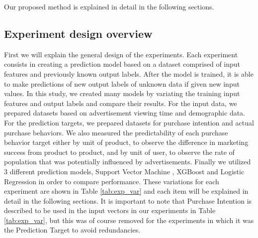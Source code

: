 \documentclass[review]{elsarticle}
\begin{document}
Our proposed method is explained in detail in the following sections.

\subsection{Experiment design overview}
\label{exp_design}

First we will explain the general design of the experiments. Each experiment consists in creating a prediction model based on a dataset comprised of input features and previously known output labels. After the model is trained, it is able to make predictions of new output labels of unknown data if given new input values. In this study, we created many models by variating the training input features and output labels and compare their results. For the input data, we prepared datasets based on advertisement viewing time and demographic data. For the prediction targets, we prepared datasets for purchase intention and actual purchase behaviors. We also measured the predictability of each purchase behavior target either by unit of product, to observe the difference in marketing success from product to product, and by unit of user, to observe the rate of population that was potentially influenced by advertisements. Finally we utilized 3 different prediction models, Support Vector Machine \cite[][]{svm}, XGBoost \cite[][]{xgboost} and Logistic Regression \cite[][]{logit} in order to compare performance. These variations for each experiment are shown in Table \ref{tab:exp_var} and each item will be explained in detail in the following sections. It is important to note that Purchase Intention is described to be used in the input vectors in our experiments in Table \ref{tab:exp_var}, but this was of course removed for the experiments in which it was the Prediction Target to avoid redundancies.
\end{document}
